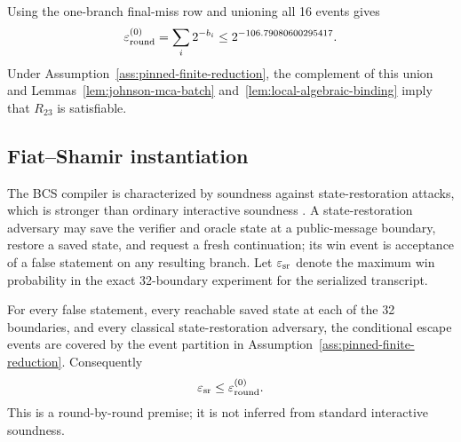 Using the one-branch final-miss row and unioning all 16 events gives
\begin{equation}
 \varepsilon_{\rm round}^{(0)}
   =\sum_i 2^{-b_i}
   \le 2^{-106.79080600295417}.
 \label{eq:coarse-interactive-error}
\end{equation}
Under Assumption~\ref{ass:pinned-finite-reduction}, the complement of this
union and Lemmas~\ref{lem:johnson-mca-batch}
and~\ref{lem:local-algebraic-binding} imply that \(R_{23}\) is satisfiable.

\subsection{Fiat--Shamir instantiation}

The BCS compiler is characterized by soundness against state-restoration
attacks, which is stronger than ordinary interactive soundness
\cite{BenSassonChiesaSpooner2016,BlockGarretaKatzThalerTiwariZajac2023}.
A state-restoration adversary may save the verifier and oracle state at a
public-message boundary, restore a saved state, and request a fresh
continuation; its win event is acceptance of a false statement on any
resulting branch.  Let \(\varepsilon_{\rm sr}\) denote the maximum win
probability in the exact 32-boundary experiment for the serialized
transcript.

\begin{assumption}
\label{ass:boundary-restoration}
For every false statement, every reachable saved state at each of the 32
boundaries, and every classical state-restoration adversary, the conditional
escape events are covered by the event partition in
Assumption~\ref{ass:pinned-finite-reduction}.  Consequently
\[
 \varepsilon_{\rm sr}\le\varepsilon_{\rm round}^{(0)}.
\]
This is a round-by-round premise; it is not inferred from standard
interactive soundness.
\end{assumption}

